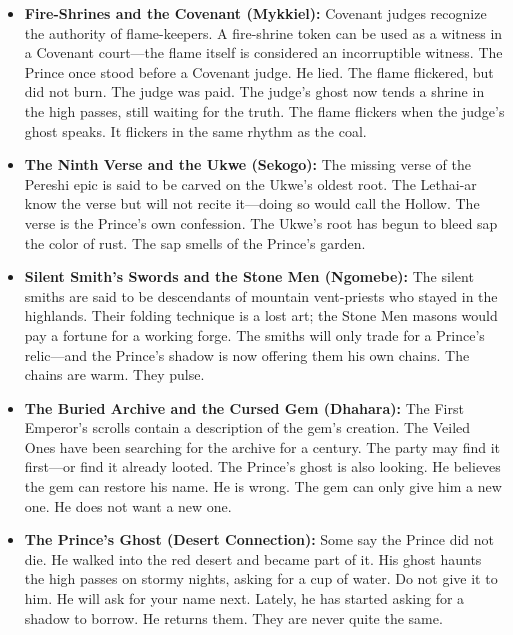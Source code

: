 \begin{itemize}
  \item \textbf{Fire-Shrines and the Covenant (Mykkiel):} Covenant judges recognize the authority of flame-keepers. A fire-shrine token can be used as a witness in a Covenant court---the flame itself is considered an incorruptible witness. The Prince once stood before a Covenant judge. He lied. The flame flickered, but did not burn. The judge was paid. The judge's ghost now tends a shrine in the high passes, still waiting for the truth. The flame flickers when the judge's ghost speaks. It flickers in the same rhythm as the coal.
  \item \textbf{The Ninth Verse and the Ukwe (Sekogo):} The missing verse of the Pereshi epic is said to be carved on the Ukwe's oldest root. The Lethai-ar know the verse but will not recite it---doing so would call the Hollow. The verse is the Prince's own confession. The Ukwe's root has begun to bleed sap the color of rust. The sap smells of the Prince's garden.
  \item \textbf{Silent Smith's Swords and the Stone Men (Ngomebe):} The silent smiths are said to be descendants of mountain vent-priests who stayed in the highlands. Their folding technique is a lost art; the Stone Men masons would pay a fortune for a working forge. The smiths will only trade for a Prince's relic---and the Prince's shadow is now offering them his own chains. The chains are warm. They pulse.
  \item \textbf{The Buried Archive and the Cursed Gem (Dhahara):} The First Emperor's scrolls contain a description of the gem's creation. The Veiled Ones have been searching for the archive for a century. The party may find it first---or find it already looted. The Prince's ghost is also looking. He believes the gem can restore his name. He is wrong. The gem can only give him a new one. He does not want a new one.
  \item \textbf{The Prince's Ghost (Desert Connection):} Some say the Prince did not die. He walked into the red desert and became part of it. His ghost haunts the high passes on stormy nights, asking for a cup of water. Do not give it to him. He will ask for your name next. Lately, he has started asking for a shadow to borrow. He returns them. They are never quite the same.
\end{itemize}

